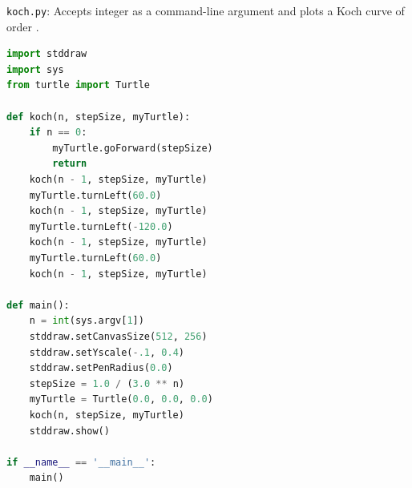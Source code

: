 \documentclass[8pt,a4paper,compress,handout]{beamer}
\begin{document}
\begin{frame}[fragile]
\begin{framed}
\tiny \lstinline{koch.py}: Accepts integer  as a command-line argument and plots a Koch curve of order .
\end{framed}

\begin{lstlisting}[language=Python]
import stddraw
import sys
from turtle import Turtle

def koch(n, stepSize, myTurtle):
    if n == 0:
        myTurtle.goForward(stepSize)
        return  
    koch(n - 1, stepSize, myTurtle)
    myTurtle.turnLeft(60.0)
    koch(n - 1, stepSize, myTurtle)
    myTurtle.turnLeft(-120.0)
    koch(n - 1, stepSize, myTurtle)
    myTurtle.turnLeft(60.0)
    koch(n - 1, stepSize, myTurtle)
 
def main():
    n = int(sys.argv[1])
    stddraw.setCanvasSize(512, 256)
    stddraw.setYscale(-.1, 0.4)
    stddraw.setPenRadius(0.0)
    stepSize = 1.0 / (3.0 ** n)
    myTurtle = Turtle(0.0, 0.0, 0.0)
    koch(n, stepSize, myTurtle)
    stddraw.show()

if __name__ == '__main__':
    main()
\end{lstlisting}
\end{frame}
\end{document}
